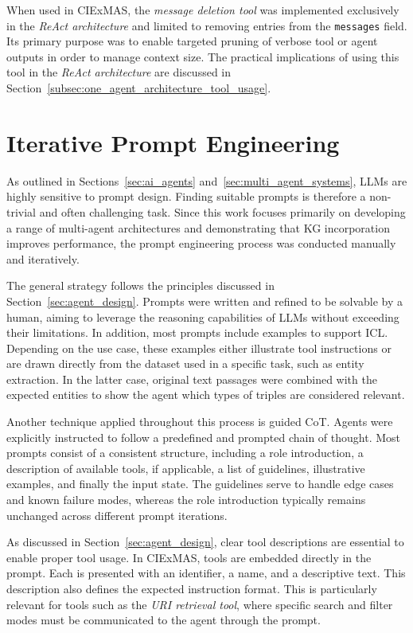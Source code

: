 \documentclass[a4paper,oneside,bibliography=totoc]{scrbook}
\begin{document}
When used in CIExMAS, the \textit{message deletion tool} was implemented exclusively in the \textit{ReAct architecture} and limited to removing entries from the \texttt{messages} field. Its primary purpose was to enable targeted pruning of verbose tool or agent outputs in order to manage context size. The practical implications of using this tool in the \textit{ReAct architecture} are discussed in Section~\ref{subsec:one_agent_architecture_tool_usage}.

\section{Iterative Prompt Engineering}
\label{sec:iterative_prompt_engineering}

As outlined in Sections~\ref{sec:ai_agents} and~\ref{sec:multi_agent_systems}, \acp{LLM} are highly sensitive to prompt design. Finding suitable prompts is therefore a non-trivial and often challenging task. Since this work focuses primarily on developing a range of multi-agent architectures and demonstrating that \ac{KG} incorporation improves performance, the prompt engineering process was conducted manually and iteratively.

The general strategy follows the principles discussed in Section~\ref{sec:agent_design}. Prompts were written and refined to be solvable by a human, aiming to leverage the reasoning capabilities of \acp{LLM} without exceeding their limitations. In addition, most prompts include examples to support \ac{ICL}. Depending on the use case, these examples either illustrate tool instructions or are drawn directly from the dataset used in a specific task, such as entity extraction. In the latter case, original text passages were combined with the expected entities to show the agent which types of triples are considered relevant.

Another technique applied throughout this process is guided \ac{CoT}. Agents were explicitly instructed to follow a predefined and prompted chain of thought. Most prompts consist of a consistent structure, including a role introduction, a description of available tools, if applicable, a list of guidelines, illustrative examples, and finally the input state. The guidelines serve to handle edge cases and known failure modes, whereas the role introduction typically remains unchanged across different prompt iterations.

As discussed in Section~\ref{sec:agent_design}, clear tool descriptions are essential to enable proper tool usage. In CIExMAS, tools are embedded directly in the prompt. Each is presented with an identifier, a name, and a descriptive text. This description also defines the expected instruction format. This is particularly relevant for tools such as the \textit{\ac{URI} retrieval tool}, where specific search and filter modes must be communicated to the agent through the prompt.
\end{document}
